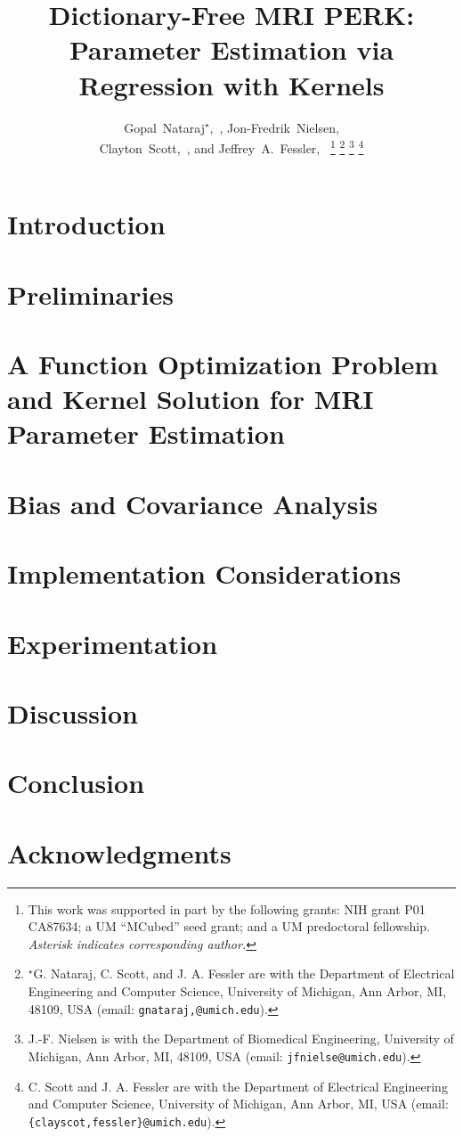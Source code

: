 \documentclass[journal]{./cls/IEEEtran}
\title{%
	Dictionary-Free MRI PERK:
	\\
	Parameter Estimation via Regression with Kernels
}
\author{%
	Gopal~Nataraj$^\star$,~\IEEEmembership{Student~Member,~IEEE}, %
	Jon-Fredrik~Nielsen,\\%
	Clayton~Scott,~\IEEEmembership{Member,~IEEE}, %
	and %
	Jeffrey~A.~Fessler,~\IEEEmembership{Fellow,~IEEE}%
	\thanks{%
		\todo{%
			Manuscript received ; 
			revised ;	 
		}
		This work was supported in part 
		by the following grants: 
		NIH grant P01 CA87634;
		a UM ``MCubed'' seed grant;
		and a UM predoctoral fellowship.
		\emph{
			Asterisk indicates corresponding author.
		}
	}%
	\thanks{%
		$^\star$G. Nataraj, C. Scott, and J. A. Fessler
		are with the Department of Electrical Engineering and Computer Science,
		University of Michigan, Ann Arbor, MI, 48109, USA
		(email: \texttt{gnataraj,@umich.edu}).
	}%
	\thanks{%
		J.-F. Nielsen is with the Department of Biomedical Engineering, 
		University of Michigan, Ann Arbor, MI, 48109, USA 
		(email: \texttt{jfnielse@umich.edu}).
	}%
	\thanks{%
		C. Scott and J. A. Fessler 
		are with the Department of Electrical Engineering and Computer Science, 
		University of Michigan, Ann Arbor, MI, USA 
		(email: \texttt{\{clayscot,fessler\}@umich.edu}).
	}%
}
\begin{document}
\maketitle

\begin{abstract}

\end{abstract}

\section{Introduction}
\label{s,intro}


\section{Preliminaries}
\label{s,rev}


\section{A Function Optimization Problem and Kernel Solution for MRI Parameter Estimation}
\label{s,meth}


\section{Bias and Covariance Analysis}
\label{s,perf}


\section{Implementation Considerations}
\label{s,pract}


\section{Experimentation}
\label{s,exp}


\section{Discussion}
\label{s,disc}


\section{Conclusion}
\label{s,conc}


\section*{Acknowledgments}
\label{s,ack}

\end{document}
